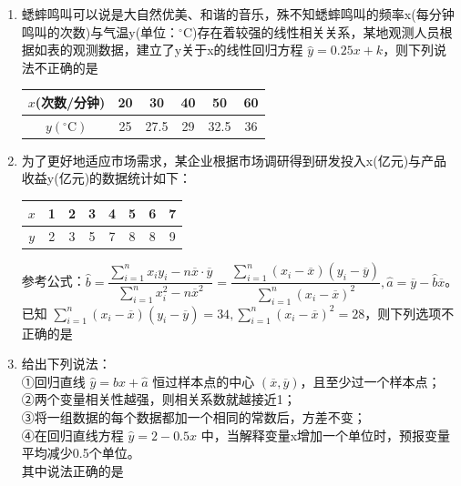 \begin{enumerate}
\item 蟋蟀鸣叫可以说是大自然优美、和谐的音乐，殊不知蟋蟀鸣叫的频率x(每分钟鸣叫的次数)与气温y(单位：$^\circ\text{C}$)存在着较强的线性相关关系，某地观测人员根据如表的观测数据，建立了y关于x的线性回归方程 $\hat{y}=0.25x+k$，则下列说法不正确的是
\begin{center}
\begin{tabular}{|c|c|c|c|c|c|}
\hline
$x$(次数/分钟) & 20 & 30 & 40 & 50 & 60 \\
\hline
$y(^\circ\text{C})$ & 25 & 27.5 & 29 & 32.5 & 36 \\
\hline
\end{tabular}
\end{center}

\item 为了更好地适应市场需求，某企业根据市场调研得到研发投入x(亿元)与产品收益y(亿元)的数据统计如下：
\begin{center}
\begin{tabular}{|c|c|c|c|c|c|c|c|}
\hline
$x$ & 1 & 2 & 3 & 4 & 5 & 6 & 7 \\
\hline
$y$ & 2 & 3 & 5 & 7 & 8 & 8 & 9 \\
\hline
\end{tabular}
\end{center}
参考公式：$\hat{b} = \dfrac{\sum_{i=1}^{n}x_{i}y_{i}-n\overline{x}\cdot\overline{y}}{\sum_{i=1}^{n}x_{i}^{2}-n\overline{x}^{2}} = \dfrac{\sum_{i=1}^{n}(x_{i}-\overline{x})(y_{i}-\overline{y})}{\sum_{i=1}^{n}(x_{i}-\overline{x})^{2}}, \hat{a}=\overline{y}-\hat{b}\overline{x}$。已知 $\sum_{i=1}^{n}(x_{i}-\overline{x})(y_{i}-\overline{y})=34, \sum_{i=1}^{n}(x_{i}-\overline{x})^{2}=28$，则下列选项不正确的是

\item 给出下列说法：\\
①回归直线 $\hat{y}=\hat{b}x+\hat{a}$ 恒过样本点的中心 $(\overline{x},\overline{y})$，且至少过一个样本点；\\
②两个变量相关性越强，则相关系数就越接近1；\\
③将一组数据的每个数据都加一个相同的常数后，方差不变；\\
④在回归直线方程 $\hat{y}=2-0.5x$ 中，当解释变量x增加一个单位时，预报变量平均减少0.5个单位。\\
其中说法正确的是


\end{enumerate}
